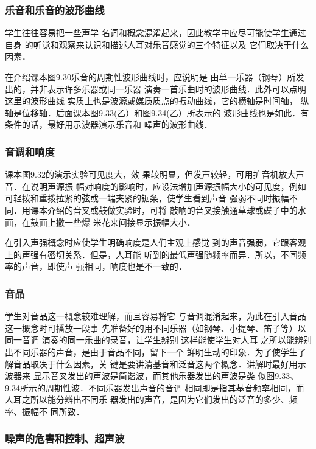 \subsubsection{乐音和乐音的波形曲线}

学生往往容易把一些声学
名词和概念混淆起来，因此教学中应尽可能使学生通过自身
的听觉和观察来认识和描述人耳对乐音感觉的三个特征以及
它们取决于什么因素．

在介绍课本图9.30乐音的周期性波形曲线时，应说明是
由单一乐器（钢琴）所发出的，并非表示许多乐器或同一乐器
演奏一首乐曲时的波形曲线．此外可以点明这里的波形曲线
实质上也是波源或媒质质点的振动曲线，它的横轴是时间轴，
纵轴是位移轴．后面课本图9.33(乙）和图9.34(乙）所表示的
波形曲线也是如此．有条件的话，最好用示波器演示乐音和
噪声的波形曲线．

\subsubsection{音调和响度}

课本图9.32的演示实验可见度大，效
果较明显，但发声较轻，可用扩音机放大声音．在说明声源振
幅对响度的影响时，应设法增加声源振幅大小的可见度，例如
可轻拨和重拨拉紧的弦或一端夹紧的锯条，使学生看到声音
强弱不同时振幅不同．用课本介绍的音叉或鼓做实验时，可将
敲响的音叉接触通草球或碟子中的水面，在鼓面上撒一些爆
米花来间接显示振幅大小．

在引入声强概念时应使学生明确响度是人们主观上感觉
到的声音强弱，它跟客观上的声强有密切关系．但是，人耳能
听到的最低声强随频率而异．所以，不同频率的声音，即使声
强相同，响度也是不一致的．

\subsubsection{音品}

学生对音品这一概念较难理解，而且容易将它
与音调混淆起来，为此在引入音品这一概念时可播放一段事
先准备好的用不同乐器（如钢琴、小提琴、笛子等）以同一音调
演奏的同一乐曲的录音，让学生辨别 这样能使学生对人耳
之所以能辨别出不同乐器的声音，是由于音品不同，留下一个
鲜明生动的印象．为了使学生了解音品取决于什么因素，关
键是要讲清基音和泛音这两个概念．讲解时最好用示波器来
显示音叉发出的声波是简谐波，而其他乐器发出的声波是类
似图9.33、9.34所示的周期性波．不同乐器发出声音的音调
相同即是指其基音频率相同，而人耳之所以能分辨出不同乐
器发出的声音，是因为它们发出的泛音的多少、频率、振幅不
同所致．

\subsubsection{噪声的危害和控制、超声波}

